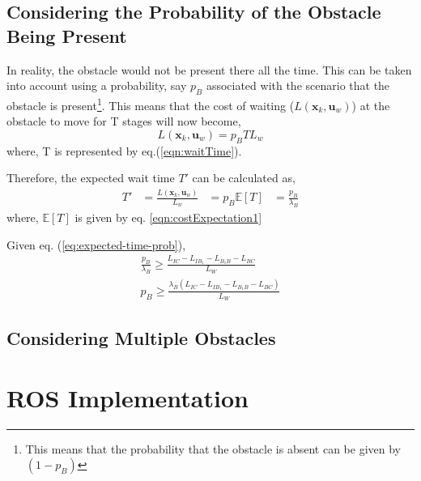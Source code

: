 \documentclass[a4paper,12pt]{article}
\begin{document}
		\subsection{Considering the Probability of the Obstacle Being Present}
		In reality, the obstacle would not be present there all the time. This can be taken into account using a probability, say $p_B$ associated with the scenario that the obstacle is present\footnote{This means that the probability that the obstacle is absent can be given by $ (1-p_B) $}. This means that the cost of waiting ($ L(\boldsymbol{x}_k,\boldsymbol{u}_w) $) at the obstacle to move for T stages will now become,
		\begin{equation}
			L(\boldsymbol{x}_k,\boldsymbol{u}_w) = p_B T L_w
		\end{equation}
		where, T is represented by eq.(\ref{eqn:waitTime}). 
		
		Therefore, the expected wait time $T'$ can be calculated as,
		\begin{equation}
		\begin{aligned}
		T'&= \frac{L(\boldsymbol{x}_k,\boldsymbol{u}_w)}{L_w}
		&= p_B \mathbb{E}[T]
		&= \frac{p_B}{\lambda_B}
		\end{aligned}
		\label{eq:expected-time-prob}
		\end{equation}
		where, $\mathbb{E}[T]$ is given by eq. \ref{eqn:costExpectation1}
		
		Given eq. (\ref{eq:expected-time-prob}), 
		\begin{equation}
		\begin{split}
		\frac{p_B}{\lambda_B} \geq \frac{L_{IC}-L_{IB_1}-L_{B_1B}-L_{BC}}{L_W} \\
		p_B \geq \frac{\lambda_B\left(L_{IC}-L_{IB_1}-L_{B_1B}-L_{BC}\right)}{L_W}
		\end{split}
		\label{eqn:constraintPlanAtStartwithProbability}
		\end{equation}
		
		
		
		\subsection{Considering Multiple Obstacles}

	
	\section{ROS Implementation}

		

	
	
	


	\newpage
	\appendix
	\appendixpage
	\addappheadtotoc
	
\end{document}
